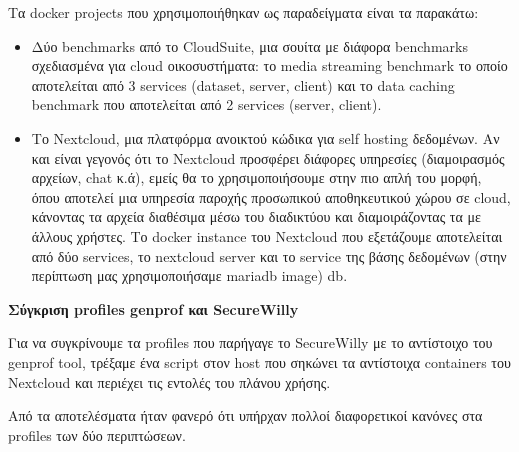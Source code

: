 Τα \en docker projects\gr{} που χρησιμοποιήθηκαν ως παραδείγματα είναι τα παρακάτω:
\begin{itemize}
\item Δύο \en benchmarks\gr{} από το \en CloudSuite\gr{}, μια σουίτα με διάφορα \en benchmarks\gr{} σχεδιασμένα για \en cloud\gr{} οικοσυστήματα: το \en media streaming benchmark\gr{} το οποίο αποτελείται από 3 \en services (dataset, server, client)\gr{} και το \en data caching benchmark\gr{} που αποτελείται από 2 \en services (server, client)\gr{}.

\item Το \en Nextcloud\gr{}, μια πλατφόρμα ανοικτού κώδικα για \en self hosting\gr{} δεδομένων. Αν και είναι γεγονός ότι το \en Nextcloud\gr{} προσφέρει διάφορες υπηρεσίες (διαμοιρασμός αρχείων, \en chat\gr{} κ.ά), εμείς θα το χρησιμοποιήσουμε στην πιο απλή του μορφή, όπου αποτελεί μια υπηρεσία παροχής προσωπικού αποθηκευτικού χώρου σε \en cloud\gr{}, κάνοντας τα αρχεία διαθέσιμα μέσω του διαδικτύου και διαμοιράζοντας τα με άλλους χρήστες. Το \en docker instance\gr{} του \en Nextcloud\gr{} που εξετάζουμε αποτελείται από δύο \en services\gr{}, το \en nextcloud server\gr{} και το \en service\gr{} της βάσης δεδομένων (στην περίπτωση μας χρησιμοποιήσαμε \en mariadb image\gr{}) \en db\gr{}.
\end{itemize}
\hfill\break
\hfill\break
\textbf{Σύγκριση \en profiles genprof\gr{} και \en SecureWilly\gr{}}
\hfill\break

Για να συγκρίνουμε τα \en profiles\gr{} που παρήγαγε το \en SecureWilly\gr{} με το αντίστοιχο του \en genprof tool\gr{}, τρέξαμε ένα \en script \gr{} στον \en host\gr{} που σηκώνει τα αντίστοιχα \en containers\gr{} του \en Nextcloud\gr{} και περιέχει τις εντολές του πλάνου χρήσης.

Από τα αποτελέσματα ήταν φανερό ότι υπήρχαν πολλοί διαφορετικοί κανόνες στα \en profiles\gr{} των δύο περιπτώσεων.

